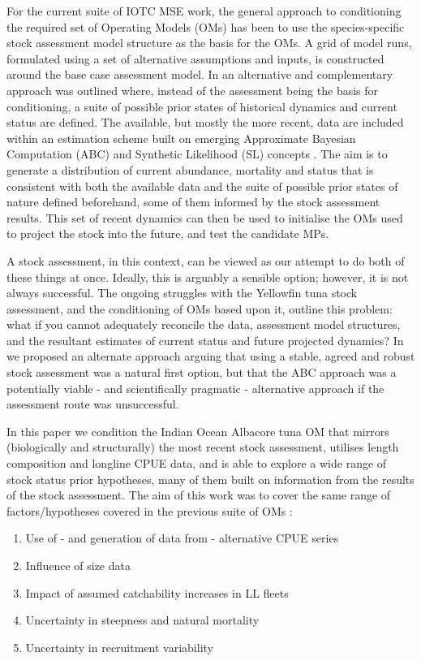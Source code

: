 \documentclass[11pt]{article}
\begin{document}
For the current suite of IOTC MSE work, the general approach to conditioning the required set of Operating Models (OMs) has been to use the species-specific stock assessment model structure as the basis for the OMs. A grid of model runs, formulated using a set of alternative assumptions and inputs, is constructed around the base case assessment model. In \cite{om21} an alternative and complementary approach was outlined where, instead of the assessment being the basis for conditioning, a suite of possible prior states of historical dynamics and current status are defined. The available, but mostly the more recent, data are included within an estimation scheme built on emerging Approximate Bayesian Computation (ABC) and Synthetic Likelihood (SL) concepts \cite{abc,synlkhd}. The aim is to generate a distribution of current abundance, mortality and status that is consistent with both the available data and the suite of possible prior states of nature defined beforehand, some of them informed by the stock assessment results. This set of recent dynamics can then be used to initialise the OMs used to project the stock into the future, and test the candidate MPs.

A stock assessment, in this context, can be viewed as our attempt to do both of these things at once. Ideally, this is arguably a sensible option; however, it is not always successful. The ongoing struggles with the Yellowfin tuna stock assessment, and the conditioning of OMs based upon it, outline this problem: what if you cannot adequately reconcile the data, assessment model structures, and the resultant estimates of current status and future projected dynamics? In \cite{om21} we proposed an alternate approach arguing that using a stable, agreed and robust stock assessment was a natural first option, but that the ABC approach was a potentially viable - and scientifically pragmatic - alternative approach if the assessment route was unsuccessful.

In this paper we condition the Indian Ocean Albacore tuna OM that mirrors (biologically and structurally) the most recent stock assessment, utilises length composition and longline CPUE data, and is able to explore a wide range of stock status prior hypotheses, many of them built on information from the results of the stock assessment. The aim of this work was to cover the
same range of factors/hypotheses covered in the previous suite of OMs \cite{alb}:

\begin{enumerate}
    \item Use of - and generation of data from - alternative CPUE series
    \item Influence of size data
    \item Impact of assumed catchability increases in LL fleets
    \item Uncertainty in steepness and natural mortality
    \item Uncertainty in recruitment variability
\end{enumerate}
\end{document}
